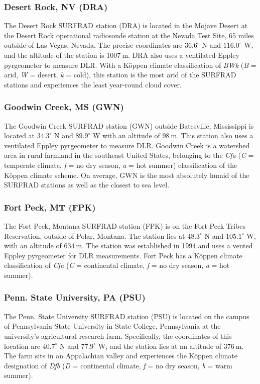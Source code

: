 \documentclass[preprint,12pt]{elsarticle}
\begin{document}
\subsubsection{Desert Rock, NV (DRA)}
The Desert Rock SURFRAD station (DRA) is located in the Mojave Desert at the Desert Rock operational radiosonde station at the Nevada Test Site, 65 miles outside of Las Vegas, Nevada. The precise coordinates are $36.6^{\circ}$ N and $116.0^{\circ}$ W, and the altitude of the station is $\SI{1007}{\meter}$. DRA also uses a ventilated Eppley pyrgeometer to measure DLR. With a Köppen climate classification of \textit{BWk} (\textit{B} = arid, \textit{W} = desert, \textit{k} = cold), this station is the most arid of the SURFRAD stations and experiences the least year-round cloud cover. 

\subsubsection{Goodwin Creek, MS (GWN)}
The Goodwin Creek SURFRAD station (GWN) outside Batesville, Mississippi is located at $34.3^{\circ}$ N and $89.9^{\circ}$ W with an altitude of $\SI{98}{\meter}$. This station also uses a ventilated Eppley pyrgeometer to measure DLR. Goodwin Creek is a watershed area in rural farmland in the southeast United States, belonging to the \textit{Cfa} (\textit{C} = temperate climate, \textit{f} = no dry season, \textit{a} = hot summer) classification of the Köppen climate scheme. On average, GWN is the most absolutely humid of the SURFRAD stations as well as the closest to sea level. 

\subsubsection{Fort Peck, MT (FPK)}
The Fort Peck, Montana SURFRAD station (FPK) is on the Fort Peck Tribes Reservation, outside of Polar, Montana. The station lies at $48.3^{\circ}$ N and $105.1^{\circ}$ W, with an altitude of $\SI{634}{\meter}$. The station was established in 1994 and uses a vented Eppley pyrgeometer for DLR measurements. Fort Peck has a Köppen climate classification of \textit{Cfa} (\textit{C} = continental climate, \textit{f} = no dry season, \textit{a} = hot summer). 

\subsubsection{Penn. State University, PA (PSU)}
The Penn. State University SURFRAD station (PSU) is located on the campus of Pennsylvania State University in State College, Pennsylvania at the university's agricultural research farm. Specifically, the coordinates of this location are $40.7^{\circ}$ N and $77.9^{\circ}$ W, and the station lies at an altitude of $\SI{376}{\meter}$. The farm sits in an Appalachian valley and experiences the Köppen climate designation of \textit{Dfb} (\textit{D} = continental climate, \textit{f} = no dry season, \textit{b} = warm summer).  
\end{document}
